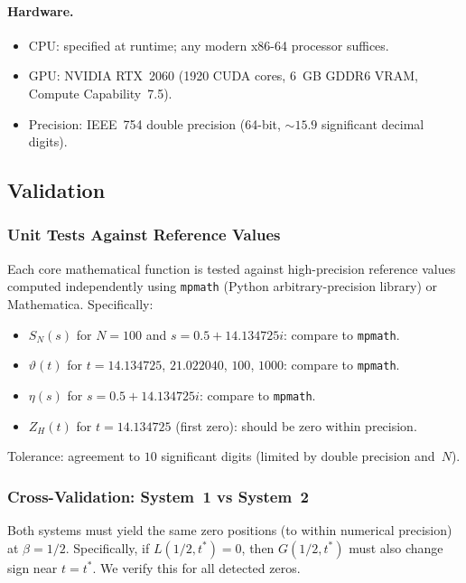 \paragraph{Hardware.}
\begin{itemize}
  \item CPU: specified at runtime; any modern x86-64 processor suffices.
  \item GPU: NVIDIA RTX~2060 (1920 CUDA cores, 6~GB GDDR6 VRAM, Compute
        Capability~7.5).
  \item Precision: IEEE~754 double precision (64-bit, $\sim 15.9$ significant decimal
        digits).
\end{itemize}


\subsection{Validation}
\label{sec:validation}

\subsubsection{Unit Tests Against Reference Values}
\label{sec:unit-tests}

Each core mathematical function is tested against high-precision reference values
computed independently using \texttt{mpmath} (Python arbitrary-precision library) or
Mathematica. Specifically:
\begin{itemize}
  \item $S_N(s)$ for $N = 100$ and $s = 0.5 + 14.134725i$: compare to \texttt{mpmath}.
  \item $\vartheta(t)$ for $t = 14.134725$, $21.022040$, $100$, $1000$: compare to
        \texttt{mpmath}.
  \item $\eta(s)$ for $s = 0.5 + 14.134725i$: compare to \texttt{mpmath}.
  \item $Z_H(t)$ for $t = 14.134725$ (first zero): should be zero within precision.
\end{itemize}
Tolerance: agreement to $10$ significant digits (limited by double precision and~$N$).

\subsubsection{Cross-Validation: System~1 vs System~2}
\label{sec:cross-val}

Both systems must yield the same zero positions (to within numerical precision) at
$\beta = 1/2$. Specifically, if $L(1/2, t^*) = 0$, then $G(1/2, t^*)$ must also change
sign near $t = t^*$. We verify this for all detected zeros.

